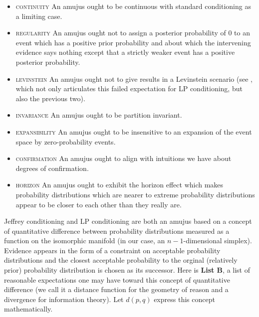 \documentclass[11pt]{article}
\begin{document}
\begin{itemize}
\item \textsc{continuity} An amujus ought to be continuous with
  standard conditioning as a limiting case.
\item \textsc{regularity} An amujus ought not to assign a posterior
  probability of $0$ to an event which has a positive prior
  probability and about which the intervening evidence says nothing
  except that a strictly weaker event has a positive posterior
  probability.
\item \textsc{levinstein} An amujus ought not to give  results in a Levinstein scenario (see
  , which not only articulates this failed
  expectation for LP conditioning, but also the previous two).
\item \textsc{invariance} An amujus ought to be partition invariant.
\item \textsc{expansibility} An amujus ought to be insensitive to an
  expansion of the event space by zero-probability events.
\item \textsc{confirmation} An amujus ought to align with intuitions
  we have about degrees of confirmation.
\item \textsc{horizon} An amujus ought to exhibit the horizon effect
  which makes probability distributions which are nearer to extreme
  probability distributions appear to be closer to each other than
  they really are.
\end{itemize}

Jeffrey conditioning and LP conditioning are both an amujus based on a
concept of quantitative difference between probability distributions
measured as a function on the isomorphic manifold (in our case, an
$n-1$-dimensional simplex). Evidence appears in the form of a
constraint on acceptable probability distributions and the closest
acceptable probability to the orginal (relatively prior) probability
distribution is chosen as its successor. Here is \textbf{List
  B}\label{page:listtwo}, a list of reasonable expectations one may
have toward this concept of quantitative difference (we call it a
distance function for the geometry of reason and a divergence for
information theory). Let $d(p,q)$ express this concept mathematically.
\end{document}
